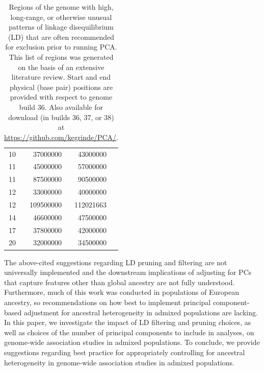 \documentclass[12pt]{article}
\newcommand{\edit}[1]{{\color{red}{#1}}}
\begin{document}
\begin{table}
\begin{tabular}{crrl}
10  &  37000000    &    43000000   &    \citep{anderson2010, price2008, weale2010}  \\
11   & 45000000    &    57000000   &    \citep{fellay2007, price2008, weale2010} \\
11   & 87500000    &    90500000   &    \citep{anderson2010, price2008, weale2010}  \\
12   & 33000000    &    40000000   &    \citep{anderson2010, price2008, weale2010} \\
12   & 109500000   &    112021663   &    \citep{price2008, weale2010} \\
14   & 46600000    &    47500000   &    \citep{prive2018} \\
17   & 37800000    &    42000000    &   \citep{novembre2008, conomos2016} \\
20   & 32000000   &     34500000    &   \citep{anderson2010, price2008, weale2010}  \\
\end{tabular}
\caption{Regions of the genome with high, long-range, or otherwise unusual patterns of linkage disequilibrium (LD) that are often recommended for exclusion prior to running PCA. This list of regions was generated on the basis of an extensive literature review. Start and end physical (base pair) positions are provided with respect to genome build 36. Also available for download (in builds 36, 37, or 38) at \href{github.com/kegrinde/PCA}{https://github.com/kegrinde/PCA/}. \edit{UPDATE TO REFLECT WHI ANALYSES}}
\label{tab:highLD}
\end{table}


The above-cited suggestions regarding LD pruning and filtering are not universally implemented and the downstream implications of adjusting for PCs that capture features other than global ancestry are not fully understood.
Furthermore, much of this work was conducted in populations of European ancestry, so recommendations on how best to implement principal component-based adjustment for ancestral heterogeneity in admixed populations are lacking. 
In this paper, we investigate the impact of LD filtering and pruning choices, as well as choices of the number of principal components to include in analyses, on genome-wide association studies in admixed populations.
\edit{We conduct simulation studies using whole genome sequence data for African American individuals in the Trans-Omics for Precision Medicine (TOPMed) project and provide analytic results to show that including too many PCs can actually induce spurious associations in GWAS, particularly when those extraneous PCs capture local genomic features rather than genome-wide ancestry.  --- ADD WHI}
To conclude, we provide suggestions regarding best practice for appropriately controlling for ancestral heterogeneity in genome-wide association studies in admixed populations.
\end{document}
